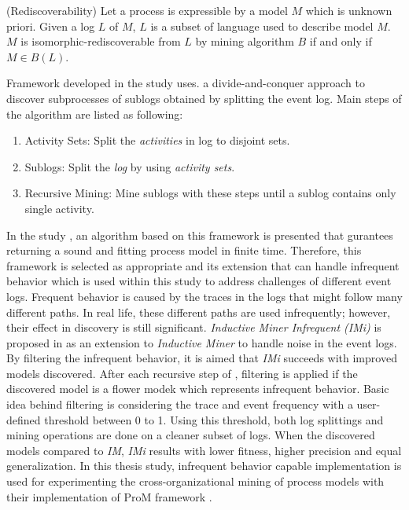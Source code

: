 \theoremstyle{definition}
\begin{definition}{}
(Rediscoverability) Let a process is expressible by a model $M$ which is unknown priori. Given a log $L$ of $M$, $L$ is a subset of language used to describe model $M$. $M$ is isomorphic-rediscoverable from $L$ by mining algorithm $B$ if and only if $M \in B(L)$.
\end{definition}
 
Framework developed in the study \cite{leemans2013discovering} uses. a divide-and-conquer approach to discover subprocesses of sublogs obtained by splitting the event log. Main steps of the algorithm are listed as following:
\begin{enumerate}
  \item Activity Sets: Split the \textit{activities} in log to disjoint sets.
  \item Sublogs: Split the \textit{log} by using \textit{activity sets}.
  \item Recursive Mining: Mine sublogs with these steps until a sublog contains only single activity.
\end{enumerate}

In the study \cite{leemans2013discovering}, an algorithm based on this framework is presented that gurantees returning a sound and fitting process model in finite time. Therefore, this framework is selected as appropriate and its extension that can handle infrequent behavior which is used within this study to address challenges of different event logs. Frequent behavior is caused by the traces in the logs that might follow many different paths. In real life, these different paths are used infrequently; however, their effect in discovery is still significant. \textit{Inductive Miner Infrequent (IMi)} is proposed in \cite{leemans2014discoveringinfrequent} as an extension to \textit{Inductive Miner} to handle noise in the event logs. By filtering the infrequent behavior, it is aimed that \textit{IMi} succeeds with improved models discovered. After each recursive step of , filtering is applied if the discovered model is a flower modek which represents infrequent behavior. Basic idea behind filtering is considering the trace and event frequency with a user-defined threshold between 0 to 1. Using this threshold, both log splittings and mining operations are done on a cleaner subset of logs. When the discovered models compared to \textit{IM}, \textit{IMi} results with lower fitness, higher precision and equal generalization.
In this thesis study, infrequent behavior capable implementation is used for experimenting the cross-organizational mining of process models with their implementation of ProM framework \cite{verbeek2010prom}.

